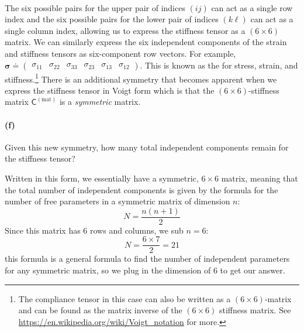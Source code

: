 \documentclass{article}
\def\stress{\boldsymbol{\sigma}}
\def\stiffness{\boldsymbol{\mathsf{C}}}
\begin{document}
\paragraph{}
The six possible pairs for the upper pair of indices $(ij)$ can act as a single row index and the
six possible pairs for the lower pair of indices $(k\ell)$ can act as a single column index, allowing us to express the stiffness tensor as a $(6\times 6)$
matrix.  We can similarly express the six independent components of the strain and stiffness tensors as six-component row vectors.  For example, $\stress\doteq \begin{pmatrix}
\sigma_{11} & \sigma_{22} & \sigma_{33} & \sigma_{23} & \sigma_{13} & \sigma_{12}\end{pmatrix}$.  This is known as the 
 for stress, strain, and stiffness.\footnote{The compliance tensor in this case can also be written
as a $(6\times 6)$-matrix and can be found as the matrix inverse of the $(6\times 6)$ stiffness matrix.  See \url{https://en.wikipedia.org/wiki/Voigt_notation} for more.}
There is an additional symmetry that becomes apparent when we express the stiffness tensor in Voigt form which is that the $(6\times 6)$-stiffness matrix $\stiffness^{(\textrm{mat})}$ 
is a \emph{symmetric} matrix.

\paragraph{(f)}
Given this new symmetry, how many total independent components remain for the stiffness tensor?

\begin{solution}
	Written in this form, we essentially have a symmetric, $6 \times 6$ matrix, meaning that the total
	number of independent components is given by the formula for the number of free parameters in a 
	symmetric matrix of dimension $n$:
	\[
	N = \frac{n(n+1)}{2}
	\] 
	Since this matrix has $6$ rows and columns, we sub $n = 6$: 
	\[
	N = \frac{6 \times 7}{2} = 21
	\] 
	this formula is a general formula to find the number of independent parameters for any symmetric matrix, 
	so we plug in the dimension of 6 to get our answer.
\end{solution}

\phline
\end{document}
